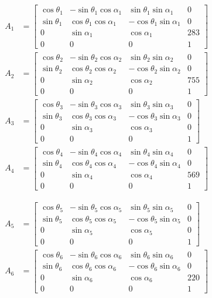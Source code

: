 \begin{align}
	A_1 &= \begin{bmatrix}
		\cos\theta_1 & -\sin\theta_1\cos\alpha_1 & \sin\theta_1\sin\alpha_1 & 0 \\
		\sin\theta_1 & \cos\theta_1\cos\alpha_1 & -\cos\theta_1\sin\alpha_1 & 0 \\
		0 & \sin\alpha_1 & \cos\alpha_1 & 283 \\
		0 & 0 & 0 & 1 
	\end{bmatrix} \nonumber \\[1em]
	A_2 &= \begin{bmatrix}
		\cos\theta_2 & -\sin\theta_2\cos\alpha_2 & \sin\theta_2\sin\alpha_2 & 0 \\
		\sin\theta_2 & \cos\theta_2\cos\alpha_2 & -\cos\theta_2\sin\alpha_2 & 0 \\
		0 & \sin\alpha_2 & \cos\alpha_2 & 755 \\
		0 & 0 & 0 & 1
	\end{bmatrix} \nonumber \\[1em]
	A_3 &= \begin{bmatrix}
		\cos\theta_3 & -\sin\theta_3\cos\alpha_3 & \sin\theta_3\sin\alpha_3 & 0 \\
		\sin\theta_3 & \cos\theta_3\cos\alpha_3 & -\cos\theta_3\sin\alpha_3 & 0 \\
		0 & \sin\alpha_3 & \cos\alpha_3 & 0 \\
		0 & 0 & 0 & 1
	\end{bmatrix} \nonumber \\[1em]
	A_4 &= \begin{bmatrix}
		\cos\theta_4 & -\sin\theta_4\cos\alpha_4 & \sin\theta_4\sin\alpha_4 & 0 \\
		\sin\theta_4 & \cos\theta_4\cos\alpha_4 & -\cos\theta_4\sin\alpha_4 & 0 \\
		0 & \sin\alpha_4 & \cos\alpha_4 & 569 \\
		0 & 0 & 0 & 1 
	\end{bmatrix} \label{eq:dh As} 
\end{align}

\begin{align}
	A_5 &= \begin{bmatrix}
		\cos\theta_5 & -\sin\theta_5\cos\alpha_5 & \sin\theta_5\sin\alpha_5 & 0 \\
		\sin\theta_5 & \cos\theta_5\cos\alpha_5 & -\cos\theta_5\sin\alpha_5 & 0 \\
		0 & \sin\alpha_5 & \cos\alpha_5 & 0 \\
		0 & 0 & 0 & 1 
	\end{bmatrix} \nonumber \\[1em]
	A_6 &= \begin{bmatrix}
		\cos\theta_6 & -\sin\theta_6\cos\alpha_6 & \sin\theta_6\sin\alpha_6 & 0 \\
		\sin\theta_6 & \cos\theta_6\cos\alpha_6 & -\cos\theta_6\sin\alpha_6 & 0 \\
		0 & \sin\alpha_6 & \cos\alpha_6 & 220 \\
		0 & 0 & 0 & 1 
	\end{bmatrix} \nonumber
\end{align}

